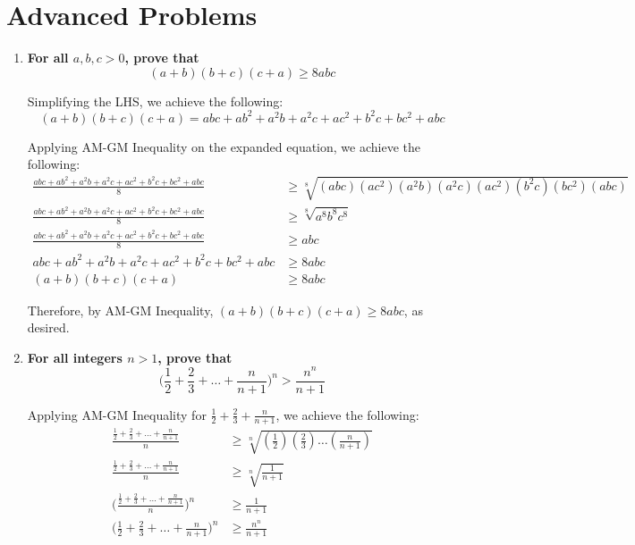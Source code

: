 \documentclass[12pt]{article}
\begin{document}
\section*{Advanced Problems}
\begin{enumerate}
    \item \textbf{For all $a, b, c > 0$, prove that $$(a + b)(b + c)(c + a) \geq 8abc$$}
    
    Simplifying the LHS, we achieve the following:
    \begin{equation*}
        (a + b)(b + c)(c + a) = abc + ab^2 + a^2b + a^2c + ac^2 +b^2c + bc^2 + abc
    \end{equation*}
    
    Applying AM-GM Inequality on the expanded equation, we achieve the following:
    \begin{align*}
        \frac{abc + ab^2 + a^2b + a^2c + ac^2 +b^2c + bc^2 + abc}{8} &\geq \sqrt[8]{(abc)(ac^2)(a^2b)(a^2c)(ac^2)(b^2c)(bc^2)(abc)} \\
        \frac{abc + ab^2 + a^2b + a^2c + ac^2 +b^2c + bc^2 + abc}{8} &\geq \sqrt[8]{a^8 b^8 c^8} \\
         \frac{abc + ab^2 + a^2b + a^2c + ac^2 +b^2c + bc^2 + abc}{8} &\geq abc \\
         abc + ab^2 + a^2b + a^2c + ac^2 +b^2c + bc^2 + abc & \geq 8abc \\
         (a + b)(b + c)(c + a) &\geq 8abc
    \end{align*}
    
    Therefore, by AM-GM Inequality, $(a + b)(b + c)(c + a) \geq 8abc$, as desired.
    
    \newpage
    
    \item \textbf{For all integers $n > 1$, prove that $$\Big(\frac{1}{2} + \frac{2}{3} + \dots + \frac{n}{n+1}\Big)^n > \frac{n^n}{n + 1}$$}
    
    Applying AM-GM Inequality for $\frac{1}{2} + \frac{2}{3} + \frac{n}{n + 1}$, we achieve the following:
    \begin{align*}
        \frac{\frac{1}{2} + \frac{2}{3} + \dots + \frac{n}{n + 1}}{n} &\geq \sqrt[n]{(\tfrac{1}{2})(\tfrac{2}{3})\dots (\tfrac{n}{n + 1})} \\
        \frac{\frac{1}{2} + \frac{2}{3} + \dots + \frac{n}{n + 1}}{n} &\geq \sqrt[n]{\tfrac{1}{n + 1}} \\
        \Big(\frac{\frac{1}{2} + \frac{2}{3} + \dots + \frac{n}{n + 1}}{n} \Big)^n &\geq \frac{1}{n + 1} \\
        \Big(\frac{1}{2} + \frac{2}{3} + \dots + \frac{n}{n + 1} \Big)^n &\geq \frac{n^n}{n + 1}
    \end{align*}
    

\end{enumerate}
\end{document}

